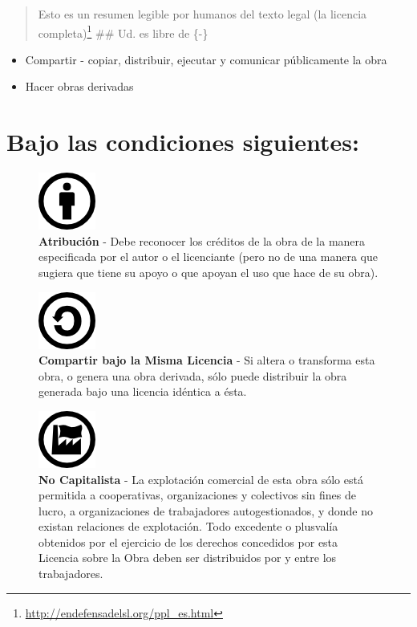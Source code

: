 \documentclass[
]{krantz}
\DeclareRobustCommand{\href}[2]{#2\footnote{\url{#1}}}
\providecommand{\tightlist}{%
  \setlength{\itemsep}{0pt}\setlength{\parskip}{0pt}}
\begin{document}
\begin{quote}
Esto es un resumen legible por humanos del \href{http://endefensadelsl.org/ppl_es.html}{texto legal (la licencia
completa)}
\#\# Ud. es libre de \{-\}
\end{quote}

\begin{itemize}
\tightlist
\item
  Compartir - copiar, distribuir, ejecutar y comunicar públicamente la obra
\item
  Hacer obras derivadas
\end{itemize}

\hypertarget{bajo-las-condiciones-siguientes}{%
\section*{Bajo las condiciones siguientes:}\label{bajo-las-condiciones-siguientes}}


\begin{figure}
\centering
\includegraphics{images/by.png}
\caption{\textbf{Atribución} - Debe reconocer los créditos de la obra de la manera
especificada por el autor o el licenciante (pero no de una manera que sugiera
que tiene su apoyo o que apoyan el uso que hace de su obra).}
\end{figure}

\begin{figure}
\centering
\includegraphics{images/sa.png}
\caption{\textbf{Compartir bajo la Misma Licencia} - Si altera o transforma esta obra, o
genera una obra derivada, sólo puede distribuir la obra generada bajo una
licencia idéntica a ésta.}
\end{figure}

\begin{figure}
\centering
\includegraphics{images/nc.png}
\caption{\textbf{No Capitalista} - La explotación comercial de esta obra sólo está permitida
a cooperativas, organizaciones y colectivos sin fines de lucro, a
organizaciones de trabajadores autogestionados, y donde no existan relaciones
de explotación. Todo excedente o plusvalía obtenidos por el ejercicio de los
derechos concedidos por esta Licencia sobre la Obra deben ser distribuidos por y
entre los trabajadores.}
\end{figure}
\end{document}
